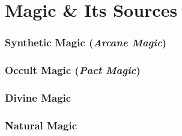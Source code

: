 \chapter{Magic \& Its Sources}

\subsection{Synthetic Magic (\textit{Arcane Magic})} 

\subsection{Occult Magic (\textit{Pact Magic})}

\subsection{Divine Magic}

\subsection{Natural Magic}
